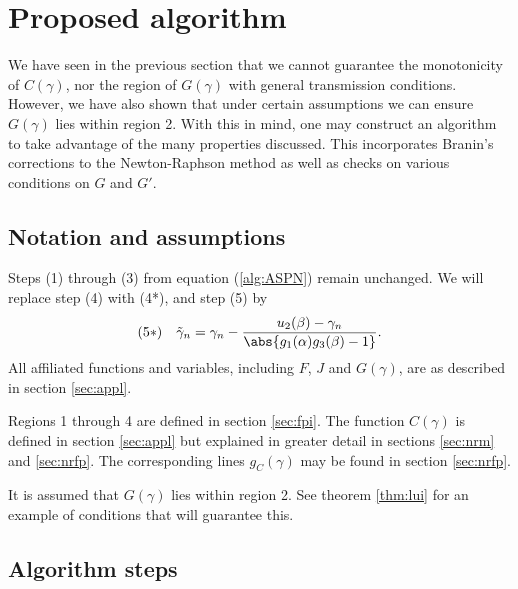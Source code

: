 \documentclass{article}
\begin{document}
\section{Proposed algorithm}
\label{sec:algo}

We have seen in the previous section that we cannot guarantee the monotonicity of $C(\gamma)$, nor the region of $G(\gamma)$ with general transmission conditions.
However, we have also shown that under certain assumptions we can ensure $G(\gamma)$ lies within region 2.
With this in mind, one may construct an algorithm to take advantage of the many properties discussed.
This incorporates Branin's corrections to the Newton-Raphson method as well as checks on various conditions on $G$ and $G'$.

\subsection{Notation and assumptions}

Steps (1) through (3) from equation (\ref{alg:ASPN}) remain unchanged.
We will replace step (4) with (4*), and step (5) by
\begin{equation*}
(5*) \quad \tilde{\gamma}_n = \gamma_n - \frac{u_2(\beta) - \gamma_n}{\abs{g_1(\alpha) g_3(\beta) - 1}} .
\end{equation*}
All affiliated functions and variables, including $F$, $J$ and $G(\gamma)$, are as described in section \ref{sec:appl}.

Regions 1 through 4 are defined in section \ref{sec:fpi}.
The function $C(\gamma)$ is defined in section \ref{sec:appl} but explained in greater detail in sections \ref{sec:nrm} and \ref{sec:nrfp}.
The corresponding lines $g_C(\gamma)$ may be found in section \ref{sec:nrfp}.

It is assumed that $G(\gamma)$ lies within region 2.
See theorem \ref{thm:lui} for an example of conditions that will guarantee this.

\subsection{Algorithm steps}
\end{document}
